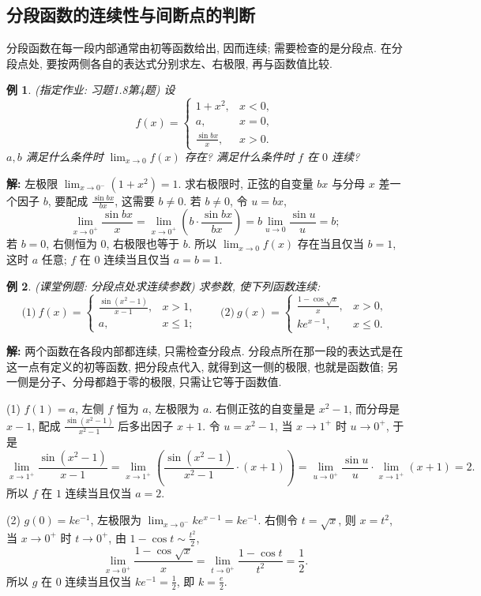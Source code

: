 \documentclass[UTF8,openany]{ctexbook}
\theoremstyle{chinesetextbook}
\newtheorem{example}{例}[section]
\newenvironment{cnsolution}{\par\indent\textbf{解:} \ignorespaces}{\par}
\begin{document}
\subsection{分段函数的连续性与间断点的判断}
分段函数在每一段内部通常由初等函数给出, 因而连续; 需要检查的是分段点. 在分段点处, 要按两侧各自的表达式分别求左、右极限, 再与函数值比较.
\begin{example}
\textnormal{(指定作业: 习题1.8第4题)} 设
\[
f(x)=\begin{cases}1+x^2,&x<0,\\a,&x=0,\\\frac{\sin bx}x,&x>0.\end{cases}
\]
$a,b$ 满足什么条件时 $\displaystyle\lim_{x\to0}f(x)$ 存在? 满足什么条件时 $f$ 在 $0$ 连续?
\end{example}
\begin{cnsolution}
左极限 $\displaystyle\lim_{x\to0^-}(1+x^2)=1$. 求右极限时, 正弦的自变量 $bx$ 与分母 $x$ 差一个因子 $b$, 要配成 $\displaystyle\frac{\sin bx}{bx}$, 这需要 $b\ne0$. 若 $b\ne0$, 令 $u=bx$,
\[
\lim_{x\to0^+}\frac{\sin bx}x=\lim_{x\to0^+}\left(b\cdot\frac{\sin bx}{bx}\right)=b\lim_{u\to0}\frac{\sin u}u=b;
\]
若 $b=0$, 右侧恒为 $0$, 右极限也等于 $b$. 所以 $\displaystyle\lim_{x\to0}f(x)$ 存在当且仅当 $b=1$, 这时 $a$ 任意; $f$ 在 $0$ 连续当且仅当 $a=b=1$.
\end{cnsolution}
\begin{example}
\textnormal{(课堂例题: 分段点处求连续参数)} 求参数, 使下列函数连续:
\[
\text{(1)}\ f(x)=\begin{cases}\frac{\sin(x^2-1)}{x-1},&x>1,\\a,&x\le1;\end{cases}\qquad\text{(2)}\ g(x)=\begin{cases}\frac{1-\cos\sqrt x}x,&x>0,\\ke^{x-1},&x\le0.\end{cases}
\]
\end{example}
\begin{cnsolution}
两个函数在各段内部都连续, 只需检查分段点. 分段点所在那一段的表达式是在这一点有定义的初等函数, 把分段点代入, 就得到这一侧的极限, 也就是函数值; 另一侧是分子、分母都趋于零的极限, 只需让它等于函数值.

(1) $f(1)=a$, 左侧 $f$ 恒为 $a$, 左极限为 $a$. 右侧正弦的自变量是 $x^2-1$, 而分母是 $x-1$, 配成 $\displaystyle\frac{\sin(x^2-1)}{x^2-1}$ 后多出因子 $x+1$. 令 $u=x^2-1$, 当 $x\to1^+$ 时 $u\to0^+$, 于是
\[
\lim_{x\to1^+}\frac{\sin(x^2-1)}{x-1}=\lim_{x\to1^+}\left(\frac{\sin(x^2-1)}{x^2-1}\cdot(x+1)\right)=\lim_{u\to0^+}\frac{\sin u}u\cdot\lim_{x\to1^+}(x+1)=2.
\]
所以 $f$ 在 $1$ 连续当且仅当 $a=2$.

(2) $g(0)=ke^{-1}$, 左极限为 $\displaystyle\lim_{x\to0^-}ke^{x-1}=ke^{-1}$. 右侧令 $t=\sqrt x$, 则 $x=t^2$, 当 $x\to0^+$ 时 $t\to0^+$, 由 $\displaystyle1-\cos t\sim\frac{t^2}2$,
\[
\lim_{x\to0^+}\frac{1-\cos\sqrt x}x=\lim_{t\to0^+}\frac{1-\cos t}{t^2}=\frac12.
\]
所以 $g$ 在 $0$ 连续当且仅当 $\displaystyle ke^{-1}=\frac12$, 即 $\displaystyle k=\frac e2$.
\end{cnsolution}
\end{document}
